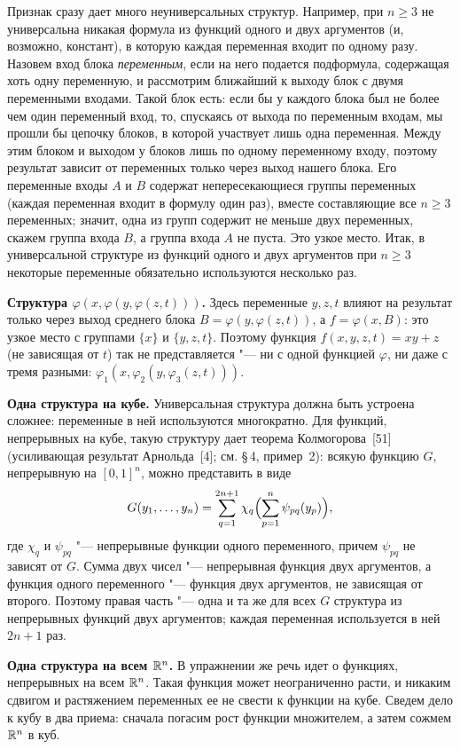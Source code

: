 \begin{solution}[5 (\S\,5)]
Признак сразу дает много неуниверсальных структур. Например, при $n\ge3$ не
универсальна никакая формула из функций одного и двух аргументов (и,
возможно, констант), в которую каждая переменная входит по одному разу.
Назовем вход блока \emph{переменным}, если на него подается подформула,
содержащая хоть одну переменную, и рассмотрим ближайший к выходу блок с
двумя переменными входами. Такой блок есть: если бы у каждого блока был
не более чем один переменный вход, то, спускаясь от выхода по переменным
входам, мы прошли бы цепочку блоков, в которой участвует лишь одна
переменная. Между этим блоком и выходом у блоков лишь по одному переменному
входу, поэтому результат зависит от переменных только через выход нашего
блока. Его переменные входы $A$ и $B$ содержат непересекающиеся группы
переменных (каждая переменная входит в формулу один раз), вместе
составляющие все $n\ge3$ переменных; значит, одна из групп содержит не
меньше двух переменных, скажем группа входа $B$, а группа входа $A$ не
пуста. Это узкое место. Итак, в универсальной структуре из функций одного
и двух аргументов при $n\ge3$ некоторые переменные обязательно
используются несколько раз.

\textbf{Структура $\varphi(x,\varphi(y,\varphi(z,t)))$.} Здесь переменные
$y,z,t$ влияют на результат только через выход среднего блока
$B=\varphi(y,\varphi(z,t))$, а $f=\varphi(x,B)$: это узкое место с группами
$\{x\}$ и $\{y,z,t\}$. Поэтому функция $f(x,y,z,t)=xy+z$ (не зависящая от $t$)
так не представляется "--- ни с одной функцией $\varphi$, ни даже с тремя
разными: $\varphi_1(x,\varphi_2(y,\varphi_3(z,t)))$.

\textbf{Одна структура на кубе.} Универсальная структура должна быть
устроена сложнее: переменные в ней используются многократно. Для функций,
непрерывных на кубе, такую структуру дает теорема Колмогорова~[51]
(усиливающая результат Арнольда~[4]; см. \S\,4, пример~2): всякую функцию $G$,
непрерывную на $[0,1]^n$, можно представить в виде
\[
G(y_1,\dots,y_n)=\sum_{q=1}^{2n+1}\chi_q\Bigl(\sum_{p=1}^{n}\psi_{pq}(y_p)\Bigr),
\]
где $\chi_q$ и $\psi_{pq}$ "--- непрерывные функции одного переменного, причем
$\psi_{pq}$ не зависят от $G$. Сумма двух чисел "--- непрерывная функция двух
аргументов, а функция одного переменного "--- функция двух аргументов, не
зависящая от второго. Поэтому правая часть "--- одна и та же для всех $G$
структура из непрерывных функций двух аргументов; каждая переменная
используется в ней $2n+1$ раз.

\textbf{Одна структура на всем $\mathbb R^n$.} В упражнении же речь идет о функциях,
непрерывных на всем $\mathbb R^n$. Такая функция может неограниченно расти, и никаким
сдвигом и растяжением переменных ее не свести к функции на кубе. Сведем дело к кубу
в два приема: сначала погасим рост функции множителем, а затем сожмем $\mathbb R^n$
в куб.


\end{solution}

